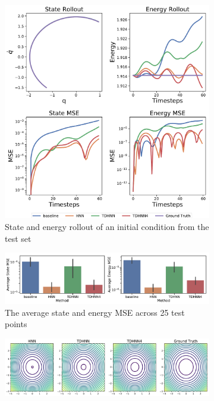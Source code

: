 \documentclass{article}
\begin{document}
\begin{figure}[!htb]
\centering
\captionsetup{justification=centering}
\begin{subfigure}[b]{0.48\textwidth}
\includegraphics[width=\textwidth]{figures/figures/mass_spring/1/mass_spring_long_0.pdf}
\caption{State and energy rollout of an initial condition from the test set}
\end{subfigure}
\begin{subfigure}[b]{0.48\textwidth}
\includegraphics[width=\textwidth]{figures/figures/mass_spring/1/mass_spring_errors_0.pdf}
\caption{The average state and energy MSE across 25 test points}
\end{subfigure}
\begin{subfigure}[b]{0.48\textwidth}
\includegraphics[width=\textwidth]{figures/figures/mass_spring/1/mass_spring_hamiltonian_0.pdf}

\end{subfigure}
\end{figure}
\end{document}
